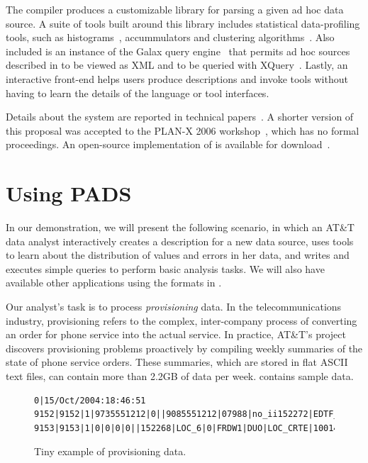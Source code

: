 The \pads{} compiler produces a customizable library for parsing a
given ad hoc data source.  A suite of tools built around this library
includes statistical data-profiling tools, such as
histograms~\cite{histograms}, accummulators and clustering
algorithms~\cite{quantiles}.  Also included is an instance of the
Galax query engine~\cite{galaxmanual} that permits ad hoc sources
described in \pads{} to be viewed as XML and to be queried with
XQuery~\cite{fernandez+:padx}.  Lastly, an interactive front-end helps
users produce \pads{} descriptions and invoke tools without having to
learn the details of the \pads{} language or tool interfaces.

Details about the \pads{} system are reported in technical
papers~\cite{fernandez+:padx,fisher+:pldi05,fisher+:popl06}.  A
shorter version of this proposal was accepted to the PLAN-X 2006
workshop~\cite{daly+:launchpads}, which has no formal proceedings.  An open-source implementation of
\pads{} is available for download~\cite{padsmanual}.
\section{Using PADS}
\label{subsec:example}

In our demonstration, we will present the following scenario, in which
an AT\&T data analyst interactively creates a \pads{} description for
a new data source, uses \pads{} tools to learn about the distribution
of values and errors in her data, and writes and executes simple
queries to perform basic analysis tasks.  We will also have available other
\pads{} applications using the formats in .

Our analyst's task is to process \textit{provisioning} data.  In the
telecommunications industry, {provisioning} refers to
the complex, inter-company process of converting an order for phone
service into the actual service.  In practice, AT\&T's \dibbler{}
project discovers provisioning problems proactively by compiling
weekly summaries of the state of phone service
orders.  These summaries, which are stored in flat ASCII text files,
can contain more than 2.2GB of data per
week.  contains sample \dibbler{} data.
\begin{figure}
\begin{small}
\begin{center}
\begin{verbatim}
0|15/Oct/2004:18:46:51
9152|9152|1|9735551212|0||9085551212|07988|no_ii152272|EDTF_6|0|APRL1|DUO|10|16/Oct/2004:10:02:10
9153|9153|1|0|0|0|0||152268|LOC_6|0|FRDW1|DUO|LOC_CRTE|1001476800|LOC_OS_10|17/Oct/2004:08:14:21
\end{verbatim}
\caption{Tiny example of \dibbler{} provisioning data.}
\label{figure:dibbler-records}
\end{center}
\end{small}
\end{figure}

